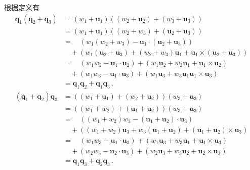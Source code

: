 \begin{prove}
    根据定义有
    \begin{align}
        {\bm q}_1({\bm q}_2+{\bm q}_3) & =(w_1+{\bm u}_1)((w_2+{\bm u}_2)+(w_3+{\bm u}_3))\nonumber                                            \\
                                       & =(w_1+{\bm u}_1)((w_2+w_3)+({\bm u}_2+{\bm u}_3))\nonumber                                            \\
                                       & =\quad (w_1(w_2+w_3)-{\bm u}_1\cdot({\bm u}_2+{\bm u}_3))\nonumber                                    \\
                                       & \quad +(w_1({\bm u}_2+{\bm u}_3)+(w_2+w_3){\bm u}_1+{\bm u}_1\times({\bm u}_2+{\bm u}_3))\nonumber    \\
                                       & =\quad (w_1w_2-{\bm u}_1\cdot{\bm u}_2)+(w_1{\bm u}_2+w_2{\bm u}_1+{\bm u}_1\times{\bm u}_2)\nonumber \\
                                       & \quad +(w_1w_3-{\bm u}_1\cdot{\bm u}_3)+(w_1{\bm u}_3+w_3{\bm u}_1{\bm u}_1\times{\bm u}_3)\nonumber  \\
                                       & ={\bm q}_1{\bm q}_2+{\bm q}_1{\bm q}_3\, .
    \end{align}
    \begin{align}
        ({\bm q}_1+{\bm q}_2){\bm q}_3 & =((w_1+{\bm u}_1)+(w_2+{\bm u}_2))(w_3+{\bm u}_3)\nonumber                                            \\
                                       & =((w_1+w_2)+({\bm u}_1+{\bm u}_2))(w_3+{\bm u}_3)\nonumber                                            \\
                                       & =\quad ((w_1+w_2)w_3-({\bm u}_1+{\bm u}_2)\cdot{\bm u}_3)\nonumber                                    \\
                                       & \quad +((w_1+w_2){\bm u}_3+w_3({\bm u}_1+{\bm u}_2)+({\bm u}_1+{\bm u}_2)\times{\bm u}_3)\nonumber    \\
                                       & =\quad (w_1w_3-{\bm u}_1\cdot{\bm u}_3)+(w_1{\bm u}_3+w_3{\bm u}_1+{\bm u}_1\times{\bm u}_3)\nonumber \\
                                       & \quad +(w_2w_3-{\bm u}_2\cdot{\bm u}_3)+(w_2{\bm u}_3+w_3{\bm u}_2+{\bm u}_2\times{\bm u}_3)\nonumber \\
                                       & ={\bm q}_1{\bm q}_3+{\bm q}_2{\bm q}_3\, .
    \end{align}
\end{prove}

